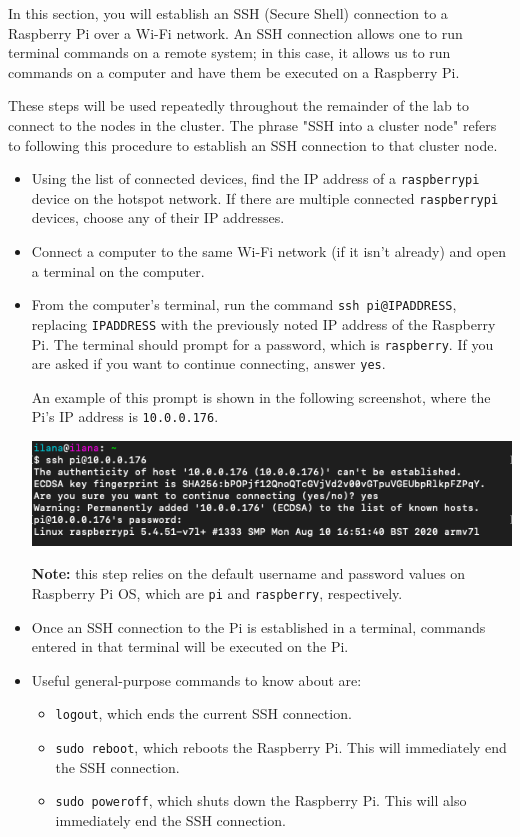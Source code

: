 \documentclass{article}
\begin{document}
In this section, you will establish an SSH (Secure Shell) connection to a Raspberry Pi over a Wi-Fi network. An SSH connection allows one to run terminal commands on a remote system; in this case, it allows us to run commands on a computer and have them be executed on a Raspberry Pi.

These steps will be used repeatedly throughout the remainder of the lab to connect to the nodes in the cluster. The phrase "SSH into a cluster node"  refers to following this procedure to establish an SSH connection to that cluster node.

\begin{itemize}
    \item Using the list of connected devices, find the IP address of a \texttt{raspberrypi} device on the hotspot network. If there are multiple connected \texttt{raspberrypi} devices, choose any of their IP addresses.
    
    \item Connect a computer to the same Wi-Fi network (if it isn't already) and open a terminal on the computer.
    
    \item From the computer's terminal, run the command \texttt{ssh pi@IPADDRESS}, replacing \texttt{IPADDRESS} with the previously noted IP address of the Raspberry Pi. The terminal should prompt for a password, which is \texttt{raspberry}. If you are asked if you want to continue connecting, answer \texttt{yes}. 
    
    An example of this prompt is shown in the following screenshot, where the Pi's IP address is \texttt{10.0.0.176}.
    
    \includegraphics[width=\textwidth]{images/ssh.png}
    
    \textbf{Note:} this step relies on the default username and password values on Raspberry Pi OS, which are \texttt{pi} and \texttt{raspberry}, respectively.
    
    \item Once an SSH connection to the Pi is established in a terminal, commands entered in that terminal will be executed on the Pi.
    
    \item Useful general-purpose commands to know about are:
    \begin{itemize}
        \item \texttt{logout}, which ends the current SSH connection.
        \item \texttt{sudo reboot}, which reboots the Raspberry Pi. This will immediately end the SSH connection.
        \item \texttt{sudo poweroff}, which shuts down the Raspberry Pi. This will also immediately end the SSH connection.
    \end{itemize}
\end{itemize}
\end{document}
